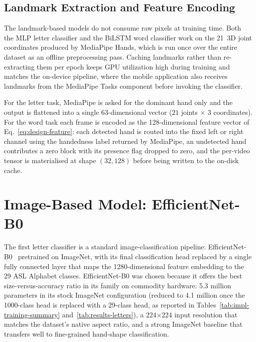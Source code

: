 \subsection{Landmark Extraction and Feature Encoding}
\label{sec:impl-landmark}

The landmark-based models do not consume raw pixels at training time.
Both the MLP letter classifier and the BiLSTM word classifier work on
the 21~3D joint coordinates produced by MediaPipe Hands, which is run
once over the entire dataset as an offline preprocessing pass.
Caching landmarks rather than re-extracting them per epoch keeps GPU
utilization high during training and matches the on-device pipeline,
where the mobile application also receives landmarks from the
MediaPipe Tasks component before invoking the classifier.

For the letter task, MediaPipe is asked for the dominant hand only
and the output is flattened into a single 63-dimensional vector
(\(21\) joints \(\times\) \(3\) coordinates). For the word task each
frame is encoded as the 128-dimensional feature vector of
Eq.~\eqref{eq:design-feature}: each detected hand is routed into the
fixed left or right channel using the handedness label returned by
MediaPipe, an undetected hand contributes a zero block with its
presence flag dropped to zero, and the per-video tensor is
materialised at shape \((32, 128)\) before being written to the
on-disk cache.

\section{Image-Based Model: EfficientNet-B0}
\label{sec:impl-efficientnet}

The first letter classifier is a standard image-classification
pipeline: EfficientNet-B0~\cite{tan2019efficientnet} pretrained on
ImageNet, with its final classification head replaced by a single
fully connected layer that maps the 1280-dimensional feature
embedding to the 29 ASL Alphabet classes. EfficientNet-B0 was chosen
because it offers the best size-versus-accuracy ratio in its family
on commodity hardware: \num{5.3} million parameters in its stock
ImageNet configuration (reduced to \num{4.1} million once the
1000-class head is replaced with a 29-class head, as reported in
Tables~\ref{tab:impl-training-summary} and~\ref{tab:results-letters}),
a 224$\times$224 input resolution that matches the dataset's native
aspect ratio, and a strong ImageNet baseline that transfers well to
fine-grained hand-shape classification.

